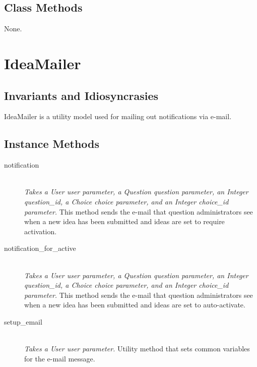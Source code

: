 \documentclass[11pt]{book}
\begin{document}
\subsection{Class Methods}

None.










\section{IdeaMailer}

\subsection{Invariants and Idiosyncrasies}

IdeaMailer is a utility model used for mailing out notifications via e-mail.

\subsection{Instance Methods}

\begin{description}
  
  \item[notification]  \hfill \\
  \emph{Takes a User user parameter, a Question question parameter, an Integer question\_id, a Choice choice parameter, and an Integer choice\_id parameter.}  This method sends the e-mail that question administrators see when a new idea has been submitted and ideas are set to require activation.
  
	\item[notification\_for\_active]  \hfill \\
  \emph{Takes a User user parameter, a Question question parameter, an Integer question\_id, a Choice choice parameter, and an Integer choice\_id parameter.}  This method sends the e-mail that question administrators see when a new idea has been submitted and ideas are set to auto-activate.

	\item[setup\_email]  \hfill \\
  \emph{Takes a User user parameter.} Utility method that sets common variables for the e-mail message.

\end{description}
\end{document}
